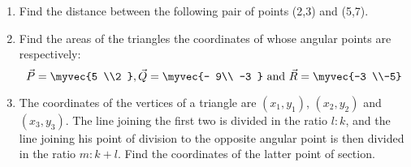 \renewcommand{\theequation}{\theenumi}
\renewcommand{\thefigure}{\theenumi}
\begin{enumerate}[label=\thesubsection.\arabic*.,ref=\thesubsection.\theenumi]

\item Find the distance between the following pair of points (2,3) and (5,7). 
\\
\solution


\item Find the areas of the triangles the coordinates of
    whose angular points are respectively: 
\begin{equation}
\Vec{P} =\myvec{5 \\2 }, \Vec{Q} =\myvec{- 9\\ -3 }\text{ and } \Vec{R} =\myvec{-3 \\-5}\\
\end{equation}
%


\item The coordinates of the vertices of a triangle are $(x_1,y_1)$, $(x_2,y_2)$ and $(x_3,y_3)$. The line joining the first two is divided in the ratio $l:k$, and the line joining his point of division to the opposite angular point is then divided in the ratio  $m:k+l$. Find the coordinates of the latter point of section. 
%
\\
\solution


\end{enumerate}
